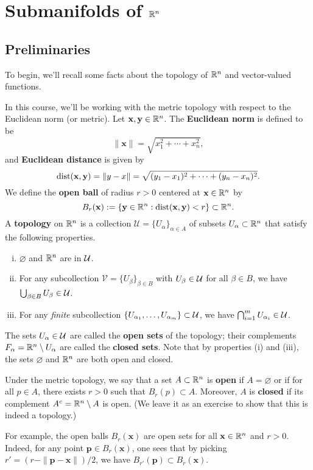 \section{Submanifolds of $\mathbb{R}^n$}\label{sec:1}

\subsection{Preliminaries}\label{subsec:1.1}
To begin, we'll recall some facts about the topology of $\mathbb{R}^n$ and 
vector-valued functions. 

In this course, we'll be working with the metric topology with respect 
to the Euclidean norm (or metric). Let $\mathbf{x}, \mathbf{y} \in \mathbb{R}^n$.
The {\bf Euclidean norm} is defined to be 
\[ \|\mathbf x\| = \sqrt{x_1^2 + \cdots + x_n^2}, \] 
and {\bf Euclidean distance} is given by 
\[ \operatorname{dist}(\mathbf x, \mathbf y) = \|y - x\| = \sqrt{(y_1 - x_1)^2 + 
\cdots + (y_n - x_n)^2}. \] 
We define the {\bf open ball} of radius $r > 0$ centered at $\mathbf x \in \mathbb{R}^n$ by 
\[ B_r(\mathbf x) := \{\mathbf y \in \mathbb{R}^n : \operatorname{dist}(\mathbf x, \mathbf y) < r\} \subset \mathbb{R}^n. \] 
A {\bf topology} on $\mathbb{R}^n$ is a collection $\mathcal{U} = \{U_\alpha\}_{\alpha \in A}$ 
of subsets $U_\alpha \subset \mathbb{R}^n$ that satisfy the following properties.
\begin{enumerate}[(i)]
    \item $\varnothing$ and $\mathbb{R}^n$ are in ${\cal U}$. 
    \item For any subcollection $\mathcal{V} = \{U_\beta\}_{\beta \in B}$ 
    with $U_\beta \in {\cal U}$ for all $\beta \in B$, we have 
    $\bigcup_{\beta \in B} U_\beta \in {\cal U}$. 
    \item For any \emph{finite} subcollection $\{U_{\alpha_1}, \dots, 
    U_{\alpha_m}\} \subset {\cal U}$, we have $\bigcap_{i=1}^m 
    U_{\alpha_i} \in {\cal U}$. 
\end{enumerate}
The sets $U_\alpha \in {\cal U}$ are called the {\bf open sets} of the topology; 
their complements $F_\alpha = \mathbb{R}^n \setminus U_\alpha$ are called the 
{\bf closed sets}. Note that by properties (i) and (iii), the sets 
$\varnothing$ and $\mathbb{R}^n$ are both open and closed. 

Under the metric topology, we say that a set $A \subset \mathbb{R}^n$ is {\bf open} 
if $A = \varnothing$ or if for all $p \in A$, there exists $r > 0$ 
such that $B_r(p) \subset A$. Moreover, $A$ is {\bf closed} if its 
complement $A^c = \mathbb{R}^n \setminus A$ is open. (We leave it as an 
exercise to show that this is indeed a topology.)

For example, the open balls $B_r(\mathbf x)$ are open sets for all 
$\mathbf x \in \mathbb{R}^n$ and $r > 0$. Indeed, for any point $\mathbf p \in 
B_r(\mathbf x)$, one sees that by picking $r' = (r - \|\mathbf p - 
\mathbf x\|)/2$, we have $B_{r'}(\mathbf p) \subset B_r(\mathbf x)$. 
